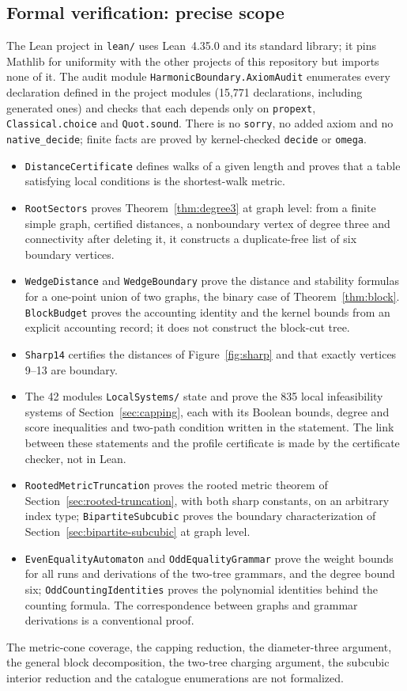 \documentclass[11pt,a4paper]{article}
\theoremstyle{definition}\newtheorem{definition}[theorem]{Definition}
\theoremstyle{remark}\newtheorem{remark}[theorem]{Remark}
\begin{document}
\subsection{Formal verification: precise scope}
The Lean project in \texttt{lean/} uses Lean~4.35.0 and its standard
library; it pins Mathlib for uniformity with the other projects of this
repository but imports none of it. The audit module
\texttt{HarmonicBoundary.AxiomAudit} enumerates every declaration defined
in the project modules (15,771 declarations, including generated ones)
and checks that each depends only on \texttt{propext},
\texttt{Classical.choice} and \texttt{Quot.sound}. There is no
\texttt{sorry}, no added axiom and no \texttt{native\_decide}; finite facts
are proved by kernel-checked \texttt{decide} or \texttt{omega}.
\begin{itemize}
\item \texttt{DistanceCertificate} defines walks of a given length and
proves that a table satisfying local conditions is the shortest-walk metric.
\item \texttt{RootSectors} proves Theorem~\ref{thm:degree3} at graph level:
from a finite simple graph, certified distances, a nonboundary vertex of
degree three and connectivity after deleting it, it constructs a
duplicate-free list of six boundary vertices.
\item \texttt{WedgeDistance} and \texttt{WedgeBoundary} prove the distance
and stability formulas for a one-point union of two graphs, the binary case
of Theorem~\ref{thm:block}. \texttt{BlockBudget} proves the accounting
identity and the kernel bounds from an explicit accounting record; it does
not construct the block-cut tree.
\item \texttt{Sharp14} certifies the distances of Figure~\ref{fig:sharp} and
that exactly vertices 9--13 are boundary.
\item The 42 modules \texttt{LocalSystems/} state and prove the 835 local
infeasibility systems of Section~\ref{sec:capping}, each with its Boolean
bounds, degree and score inequalities and two-path condition written in the
statement. The link between these statements and the profile certificate is
made by the certificate checker, not in Lean.
\item \texttt{RootedMetricTruncation} proves the rooted metric theorem of
Section~\ref{sec:rooted-truncation}, with both sharp constants, on an
arbitrary index type; \texttt{BipartiteSubcubic} proves the boundary
characterization of Section~\ref{sec:bipartite-subcubic} at graph level.
\item \texttt{EvenEqualityAutomaton} and \texttt{OddEqualityGrammar} prove
the weight bounds for all runs and derivations of the two-tree grammars,
and the degree bound six; \texttt{OddCountingIdentities} proves the
polynomial identities behind the counting formula. The correspondence
between graphs and grammar derivations is a conventional proof.
\end{itemize}
The metric-cone coverage, the capping reduction, the diameter-three
argument, the general block decomposition, the two-tree charging argument,
the subcubic interior reduction and the catalogue enumerations are not
formalized.
\end{document}
